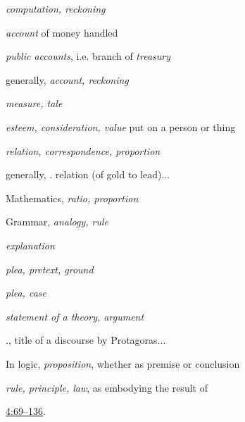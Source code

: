 \begin{compactdesc}
						\begin{compactitem}
							\item[I] \textit{computation, reckoning}
							\item[I.1.a] \textit{account} of money handled
							\item[I.1.b] \textit{public accounts}, i.e. branch of \textit{treasury}
							\item[I.2] generally, \textit{account, reckoning}
							\item[I.3] \textit{measure, tale}
							\item[I.4] \textit{esteem, consideration, value} put on a person or thing
							\item[II] \textit{relation, correspondence, proportion}
							\item[II.1] generally, . relation (of gold to lead)...
							\item[II.2] Mathematics, \textit{ratio, proportion}
							\item[II.3] Grammar, \textit{analogy, rule}
							\item[III] \textit{explanation}
							\item[III.1.a] \textit{plea, pretext, ground}
							\item[III.1.b] \textit{plea, case}
							\item[III.2.a] \textit{statement of a theory, argument}
							\item[III.2.b] ., title of a discourse by Protagoras...
							\item[III.2.c] In logic, \textit{proposition}, whether as premise or conclusion
							\item[III.2.d] \textit{rule, principle, law}, as embodying the result of 
						\end{compactitem}
					\item[TDNT] \href{https://drive.google.com/file/d/1pbXBjj7Em3K7JqcauiaXpz-RphcX6cdj/view?usp=sharing}{4:69--136}.

\end{compactdesc}

